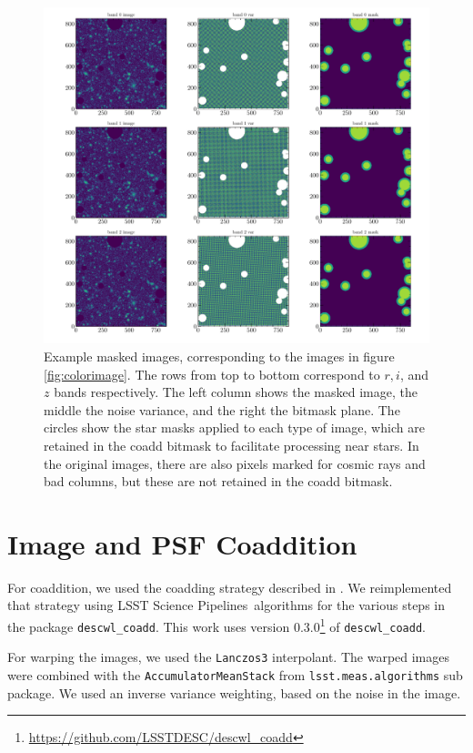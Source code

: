 \documentclass[twocolumn,twocolappendix,astrosym]{openjournal}
\newcommand{\dm}{LSST Science Pipelines}
\begin{document}
\begin{figure}
    \includegraphics[width=\columnwidth]{example-masked-image.pdf}
    \caption{
        Example masked images, corresponding to the images in figure
        \ref{fig:colorimage}.  The rows from top to bottom correspond to $r,
        i$, and $z$ bands respectively.  The left column shows the masked
        image, the middle the noise variance, and the right the bitmask plane.
        The circles show the star masks applied to each type of image, which
        are retained in the coadd bitmask to facilitate processing near stars.
        In the original images, there are also pixels marked for cosmic rays
        and bad columns, but these are not retained in the coadd bitmask.
    }
\end{figure}



\section{Image and PSF Coaddition} \label{sec:coadding}

For coaddition, we used the coadding strategy described in
\citet{BeckerMdetCoadd}. We reimplemented that strategy using \dm\ algorithms
for the various steps in the package \texttt{descwl\_coadd}. This work uses
version 0.3.0\footnote{\url{https://github.com/LSSTDESC/descwl_coadd}} of
\texttt{descwl\_coadd}.

For warping the images, we used the \texttt{Lanczos3} interpolant. The warped images
were combined with the \texttt{AccumulatorMeanStack} from \texttt{lsst.meas.algorithms}
sub package. We used an inverse variance weighting, based on the noise in
the image.
\end{document}
